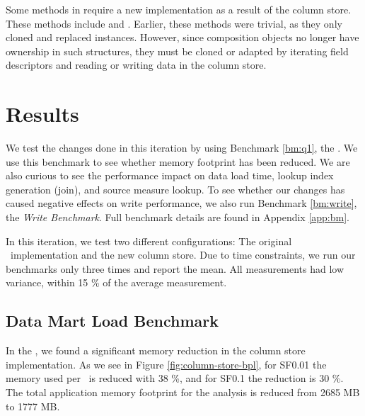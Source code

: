 Some methods in  require a new implementation as a result of the column store. These methods include  and . Earlier, these methods were trivial, as they only cloned and replaced  instances. However, since composition objects no longer have ownership in such structures, they must be cloned or adapted by iterating field descriptors and reading or writing data in the column store.

\section{Results}
\label{sec:Results}
We test the changes done in this iteration by using Benchmark \ref{bm:q1}, the \tpchdl. We use this benchmark to see whether memory footprint has been reduced. We are also curious to see the performance impact on data load time, lookup index generation (join), and source measure lookup. To see whether our changes has caused negative effects on write performance, we also run Benchmark \ref{bm:write}, the \textit{Write Benchmark}. Full benchmark details are found in Appendix \ref{app:bm}.

In this iteration, we test two different configurations: The original \gap~implementation and the new column store. Due to time constraints, we run our benchmarks only three times and report the mean. All measurements had low variance, within 15 \% of the average measurement.

\subsection{Data Mart Load Benchmark}
\label{column-store:q1}

In the \tpchdl, we found a significant memory reduction in the column store implementation. As we see in Figure \ref{fig:column-store-bpl}, for SF0.01 the memory used per \lineitem~is reduced with 38 \%, and for SF0.1 the reduction is 30 \%. The total application memory footprint for the analysis is reduced from 2685 MB to 1777 MB.

